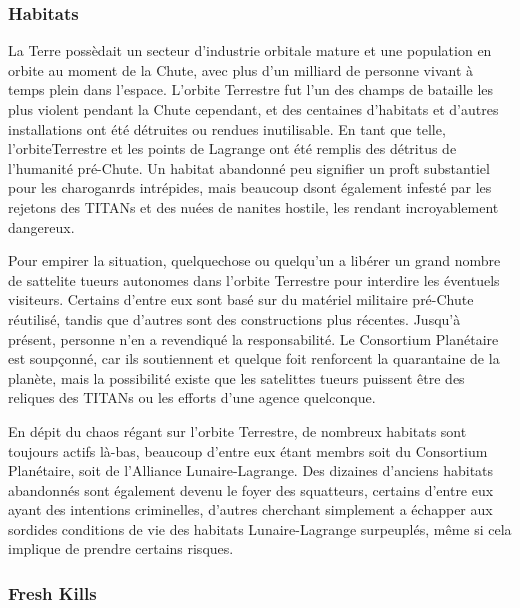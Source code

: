                                                          \subsubsection{Habitats} \label{sec:habitats-2} 

                                                         La Terre possèdait un secteur d'industrie orbitale mature et une population en orbite au moment de la Chute, avec plus d'un milliard de personne vivant à temps plein dans l'espace. L'orbite Terrestre fut l'un des champs de bataille les plus violent pendant la Chute cependant, et des centaines d'habitats et d'autres installations ont été détruites ou rendues inutilisable. En tant que telle, l'orbiteTerrestre et les points de Lagrange ont été remplis des détritus de l'humanité pré-Chute. Un habitat abandonné peu signifier un proft substantiel pour les charoganrds intrépides, mais beaucoup dsont également infesté par les rejetons des TITANs et des nuées de nanites hostile, les rendant incroyablement dangereux. 

                                                         Pour empirer la situation, quelquechose ou quelqu'un a libérer un grand nombre de sattelite tueurs autonomes dans l'orbite Terrestre pour interdire les éventuels visiteurs. Certains d'entre eux sont basé sur du matériel militaire pré-Chute réutilisé, tandis que d'autres sont des constructions plus récentes. Jusqu'à présent, personne n'en a revendiqué la responsabilité. Le Consortium Planétaire est soupçonné, car ils soutiennent et quelque foit renforcent la quarantaine de la planète, mais la possibilité existe que les satelittes tueurs puissent être des reliques des TITANs ou les efforts d'une agence quelconque. 

                                                         En dépit du chaos régant sur l'orbite Terrestre, de nombreux habitats sont toujours actifs là-bas, beaucoup d'entre eux étant membrs soit du Consortium Planétaire, soit de l'Alliance Lunaire-Lagrange. Des dizaines d'anciens habitats abandonnés sont également devenu le foyer des squatteurs, certains d'entre eux ayant des intentions criminelles, d'autres cherchant simplement a échapper aux sordides conditions de vie des habitats Lunaire-Lagrange surpeuplés, même si cela implique de prendre certains risques. 

                                                         \subsubsection{Fresh Kills} \label{sec:fresh-kills} 

